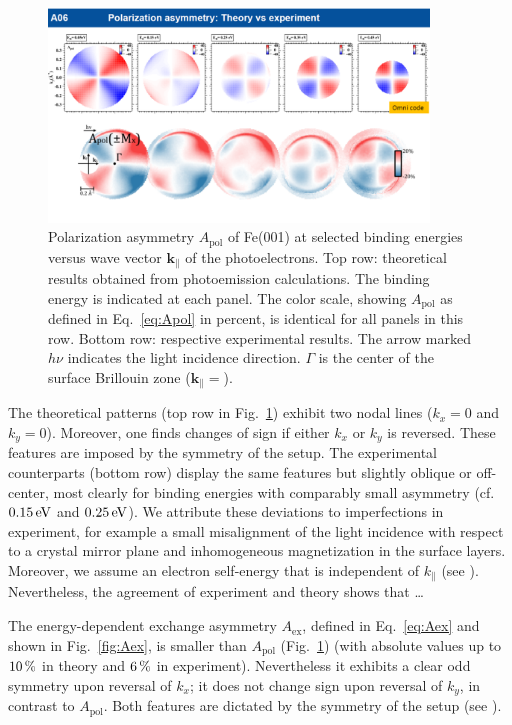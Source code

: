 \documentclass[prl,twocolumn,floatfix]{revtex4-2}
\renewcommand{\vec}[1]{\boldsymbol{#1}}
\begin{document}
\begin{figure}
    \centering
    \includegraphics[width = 0.9\textwidth]{Apol}
    \caption{Polarization asymmetry $A_{\mathrm{pol}}$ of Fe(001) at selected binding energies versus wave vector $\vec{k}_{\parallel}$ of the photoelectrons. Top row: theoretical results obtained from photoemission calculations. The binding energy is indicated at each panel. The color scale, showing $A_{\mathrm{pol}}$ as defined in Eq.~\eqref{eq:Apol} in percent, is identical for all panels in this row. Bottom row: respective experimental results. The arrow marked $h \nu$ indicates the light incidence direction. $\Gamma$ is the center of the surface Brillouin zone ($\vec{k}_{\parallel} = $).}
    \label{fig:Apol}
\end{figure}

The theoretical patterns (top row in Fig.~\ref{fig:Apol}) exhibit two nodal lines ($k_{x} = 0$ and $k_{y} = 0$). Moreover, one finds changes of sign if either $k_{x}$ or $k_{y}$ is reversed. These features are imposed by the symmetry of the setup. The experimental counterparts (bottom row) display the same features but slightly oblique or off-center, most clearly for binding energies with comparably small asymmetry (cf.\ $\unit[0.15]{eV}$ and $\unit[0.25]{eV}$). We attribute these deviations to imperfections in experiment, for example a small misalignment of the light incidence with respect to a crystal mirror plane and inhomogeneous magnetization in the surface layers. Moreover, we assume an electron self-energy that is independent of $k_{\parallel}$ (see \cite{Supplement}). Nevertheless, the agreement of experiment and theory shows that \ldots {}

The energy-dependent exchange asymmetry $A_{\mathrm{ex}}$, defined in Eq.~\eqref{eq:Aex} and shown in Fig.~\ref{fig:Aex}, is smaller than $A_{\mathrm{pol}}$ (Fig.~\ref{fig:Apol}) (with absolute values up to $\unit[10]{\%}$ in theory and $\unit[6]{\%}$ in experiment). Nevertheless it exhibits a clear odd symmetry upon reversal of $k_{x}$; it does not change sign upon reversal of $k_{y}$, in contrast to $A_{\mathrm{pol}}$. Both features are dictated by the symmetry of the setup (see \cite{Supplement}).
\end{document}
